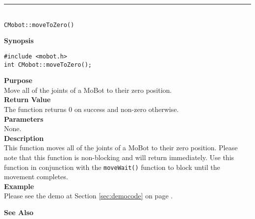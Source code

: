 \noindent
\vspace{5pt}
\rule{4.5in}{0.015in}\\
\noindent
{\LARGE \texttt{CMobot::moveToZero()}}\\
{}

\noindent
{\bf Synopsis}\\
\begin{verbatim}
#include <mobot.h>
int CMobot::moveToZero();
\end{verbatim}

\noindent
{\bf Purpose}\\
Move all of the joints of a MoBot to their zero position.\\

\noindent
{\bf Return Value}\\
The function returns 0 on success and non-zero otherwise.\\

\noindent
{\bf Parameters}\\
None.\\

\noindent
{\bf Description}\\
This function moves all of the joints of a MoBot to their zero position.
Please note that this function is non-blocking and will return immediately. Use
this function in conjunction with the \texttt{moveWait()} function to block
until the movement completes.\\

\noindent
{\bf Example}\\
Please see the demo at Section \ref{sec:democode} on page \pageref{sec:democode}.\\
\noindent

\noindent
{\bf See Also}\\

